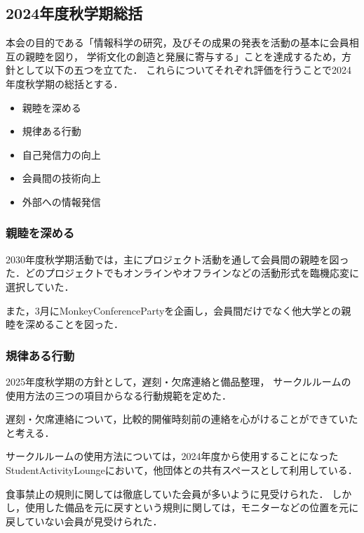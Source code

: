 \subsection*{2024年度秋学期総括}


本会の目的である「情報科学の研究，及びその成果の発表を活動の基本に会員相互の親睦を図り，
学術文化の創造と発展に寄与する」ことを達成するため，方針として以下の五つを立てた．
これらについてそれぞれ評価を行うことで2024年度秋学期の総括とする．

\begin{itemize}
    \item 親睦を深める
    \item 規律ある行動
    \item 自己発信力の向上
    \item 会員間の技術向上
    \item 外部への情報発信
\end{itemize}

\subsubsection*{親睦を深める}
    2030年度秋学期活動では，主にプロジェクト活動を通して会員間の親睦を図った．どのプロジェクトでもオンラインやオフラインなどの活動形式を臨機応変に選択していた．

    また，3月にMonkeyConferencePartyを企画し，会員間だけでなく他大学との親睦を深めることを図った．

\subsubsection*{規律ある行動}
    2025年度秋学期の方針として，遅刻・欠席連絡と備品整理，
    サークルルームの使用方法の三つの項目からなる行動規範を定めた．

    遅刻・欠席連絡について，比較的開催時刻前の連絡を心がけることができていたと考える．

    サークルルームの使用方法については，2024年度から使用することになったStudentActivityLoungeにおいて，他団体との共有スペースとして利用している．

    食事禁止の規則に関しては徹底していた会員が多いように見受けられた．
    しかし，使用した備品を元に戻すという規則に関しては，モニターなどの位置を元に戻していない会員が見受けられた．


